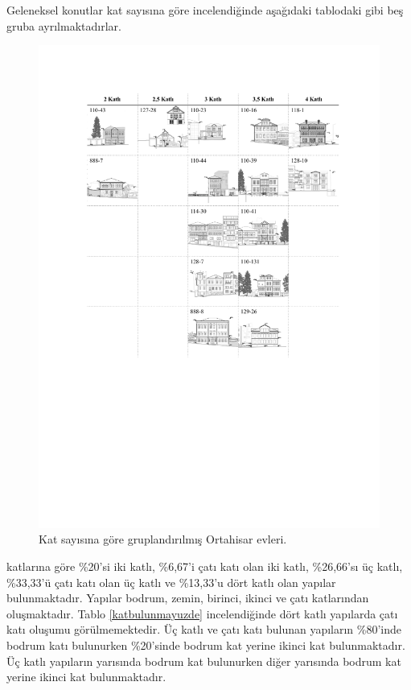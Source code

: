 \documentclass[12pt,turkish,a4paperpaper,]{report}
\begin{document}
Geleneksel konutlar kat sayısına göre incelendiğinde aşağıdaki tablodaki
gibi beş gruba ayrılmaktadırlar.

\begin{figure}
\centering
\includegraphics[width=1\textwidth,height=\textheight]{source/figures/katgruplandirma.pdf}
\caption{Kat sayısına göre gruplandırılmış Ortahisar evleri.
\label{katgruplama}}
\end{figure}

katlarına göre \%20'si iki katlı, \%6,67'i çatı katı olan iki katlı,
\%26,66'sı üç katlı, \%33,33'ü çatı katı olan üç katlı ve \%13,33'u dört
katlı olan yapılar bulunmaktadır. Yapılar bodrum, zemin, birinci, ikinci
ve çatı katlarından oluşmaktadır. Tablo \ref{katbulunmayuzde}
incelendiğinde dört katlı yapılarda çatı katı oluşumu görülmemektedir.
Üç katlı ve çatı katı bulunan yapıların \%80'inde bodrum katı bulunurken
\%20'sinde bodrum kat yerine ikinci kat bulunmaktadır. Üç katlı
yapıların yarısında bodrum kat bulunurken diğer yarısında bodrum kat
yerine ikinci kat bulunmaktadır.
\end{document}
